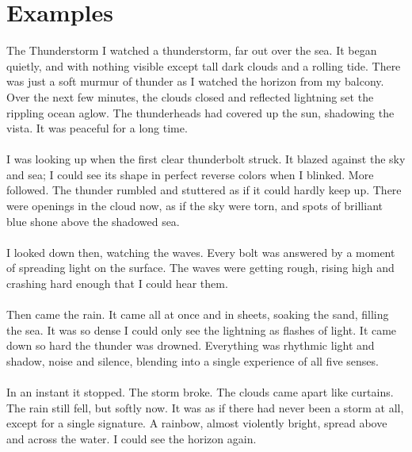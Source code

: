\section{Examples}
\begin{mytcbox}{The Thunderstorm}
	I watched a thunderstorm, far out over the sea. It began quietly, and with nothing visible except tall dark clouds and a rolling tide. There was just a soft murmur of thunder as I watched the horizon from my balcony. Over the next few minutes, the clouds closed and reflected lightning set the rippling ocean aglow. The thunderheads had covered up the sun, shadowing the vista. It was peaceful for a long time.
	\\
	\\
	I was looking up when the first clear thunderbolt struck. It blazed against the sky and sea; I could see its shape in perfect reverse colors when I blinked. More followed. The thunder rumbled and stuttered as if it could hardly keep up. There were openings in the cloud now, as if the sky were torn, and spots of brilliant blue shone above the shadowed sea.
	\\
	\\
	I looked down then, watching the waves. Every bolt was answered by a moment of spreading light on the surface. The waves were getting rough, rising high and crashing hard enough that I could hear them.
	\\
	\\
	Then came the rain. It came all at once and in sheets, soaking the sand, filling the sea. It was so dense I could only see the lightning as flashes of light. It came down so hard the thunder was drowned. Everything was rhythmic light and shadow, noise and silence, blending into a single experience of all five senses.
	\\
	\\
	In an instant it stopped. The storm broke. The clouds came apart like curtains. The rain still fell, but softly now. It was as if there had never been a storm at all, except for a single signature. A rainbow, almost violently bright, spread above and across the water. I could see the horizon again.
\end{mytcbox}


